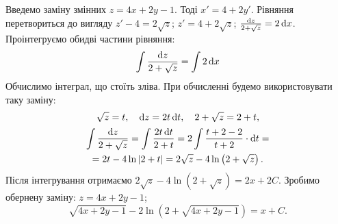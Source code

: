\begin{solution}
	Введемо заміну змінних $z = 4 x + 2 y - 1$. Тоді $x' = 4 + 2 y'$. Рівняння перетвориться до вигляду $z' - 4 = 2 \sqrt{z}$; $z' = 4 + 2 \sqrt{z}$; $\frac{\mathop{}\!\mathrm{d} z}{2 + \sqrt{z}} = 2 \mathop{}\!\mathrm{d} x$. Проінтегруємо обидві частини рівняння:
	\begin{equation}
		\label{eq:1.18}
		\int \frac{\mathop{}\!\mathrm{d} z}{2 + \sqrt{z}} = \int 2 \mathop{}\!\mathrm{d} x
	\end{equation}
	Обчислимо інтеграл, що стоїть зліва. При обчисленні будемо використовувати таку заміну: 
	\begin{equation*}
		\sqrt{z} = t, \quad \mathop{}\!\mathrm{d} z = 2 t \mathop{}\!\mathrm{d} t, \quad 2 + \sqrt{z} = 2 + t,
	\end{equation*}
	\begin{multline}
		\label{eq:1.19}
		\int \frac{\mathop{}\!\mathrm{d} z}{2 + \sqrt{z}} = \int \frac{2 t \mathop{}\!\mathrm{d} t}{2 + t} = 2 \int \frac{t + 2 - 2}{t + 2} \cdot \mathop{}\!\mathrm{d} t = \\
		= 2 t - 4 \ln |2 + t| = 2 \sqrt{z} - 4 \ln \left(2 + \sqrt{z}\right).
	\end{multline}
	Після інтегрування отримаємо $2 \sqrt{z} - 4 \ln \left(2 + \sqrt{z}\right) = 2 x + 2 C$. Зробимо обернену заміну: $z = 4x + 2y - 1$;
	\begin{equation}
		\label{eq:1.20}
		\sqrt{4x + 2y - 1} - 2 \ln \left(2 + \sqrt{4x + 2y - 1}\right) = x + C.
	\end{equation}
\end{solution}

